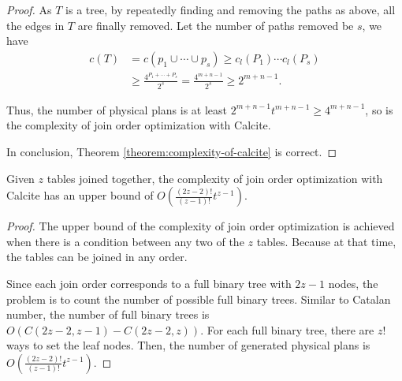 \begin{proof}
    As $T$ is a tree, by repeatedly finding and removing the paths as above, all the edges in $T$ are finally removed.
    Let the number of paths removed be $s$, we have 
    \begin{equation*}
        \begin{split}
            c(T) & = c(p_1 \cup \cdots \cup p_s) \geq c_l(P_1) \cdots c_l(P_s) \\
            & \geq \frac{4^{P_1 + \cdots + P_s}}{2^s} = \frac{4^{m + n - 1}}{2^s} \geq 2^{m+n-1}.
        \end{split}
    \end{equation*}
    
    

    Thus, the number of physical plans is at least $2^{m+n-1}t^{m+n-1} \geq 4^{m+n-1}$, so is the complexity of join order optimization with Calcite.
   
    In conclusion, Theorem \ref{theorem:complexity-of-calcite} is correct.
\end{proof}

\begin{lemma}
    \label{lemma:upper-bound-of-calcite}
    Given $z$ tables joined together, the complexity of join order optimization with Calcite has an upper bound of $O(\frac{(2z-2)!}{(z-1)!}t^{z-1})$.
\end{lemma}
\begin{proof}
    The upper bound of the complexity of join order optimization is achieved when there is a condition between any two of the $z$ tables.
    Because at that time, the tables can be joined in any order.

    Since each join order corresponds to a full binary tree with $2z-1$ nodes, the problem is to count the number of possible full binary trees.
    Similar to Catalan number, the number of full binary trees is $O(C(2z-2, z-1) - C(2z-2, z))$.
    For each full binary tree, there are $z!$ ways to set the leaf nodes. 
    Then, the number of generated physical plans is $O(\frac{(2z-2)!}{(z-1)!}t^{z-1})$.
\end{proof}


